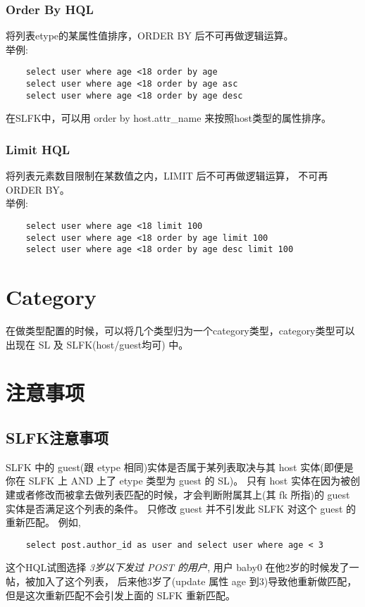 \documentclass[10pt,a4paper]{article}
\begin{document}
\begin{CJK}{UTF8}{gbsn}
  \subsubsection{Order By HQL}

  将列表etype的某属性值排序，ORDER BY 后不可再做逻辑运算。\\

  举例:

\begin{verbatim}
    select user where age <18 order by age
    select user where age <18 order by age asc
    select user where age <18 order by age desc
\end{verbatim}
  在SLFK中，可以用 order by host.attr\_name 来按照host类型的属性排序。

  \subsubsection{Limit HQL}

  将列表元素数目限制在某数值之内，LIMIT 后不可再做逻辑运算， 不可再 ORDER BY。\\

  举例:

\begin{verbatim}
    select user where age <18 limit 100
    select user where age <18 order by age limit 100
    select user where age <18 order by age desc limit 100
\end{verbatim}

  \section{Category}

  在做类型配置的时候，可以将几个类型归为一个category类型，category类型可以出现在 SL 及 SLFK(host/guest均可) 中。

  \section{注意事项}
  \subsection{SLFK注意事项}

  SLFK 中的 guest(跟 etype 相同)实体是否属于某列表取决与其 host 实体(即便是你在 SLFK 上 AND 上了 etype 类型为 guest 的 SL)。
  只有 host 实体在因为被创建或者修改而被拿去做列表匹配的时候，才会判断附属其上(其 fk 所指)的 guest 实体是否满足这个列表的条件。
  只修改 guest 并不引发此 SLFK 对这个 guest 的重新匹配。
  例如,
\begin{verbatim}
    select post.author_id as user and select user where age < 3
\end{verbatim}
  这个HQL试图选择 \emph{3岁以下发过 POST 的用户}, 用户 baby0 在他2岁的时候发了一帖，被加入了这个列表，
  后来他3岁了(update 属性 age 到3)导致他重新做匹配， 但是这次重新匹配不会引发上面的 SLFK 重新匹配。


\end{CJK}
\end{document}
